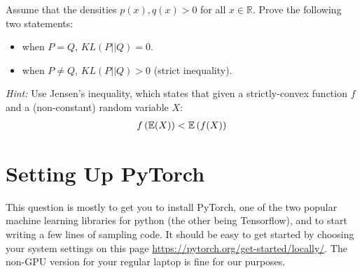 \documentclass[11pt]{article}
\begin{document}
\noindent Assume that the densities $p(x), q(x) > 0$ for all $x \in \mathbb{R}$. Prove the following two statements:
    \begin{itemize}
        \item when $P=Q$, $KL(P||Q)=0$.
        
        \item when $P \neq Q$, $KL(P||Q) > 0$ (strict inequality).\\
    \end{itemize}
    
\noindent \textit{Hint:} Use Jensen's inequality, which states that given a strictly-convex function $f$ and a (non-constant) random variable $X$:
\begin{align*}
    f\left( \mathbb{E}(X) \right) < \mathbb{E} \left( f (X) \right)
\end{align*}


\newpage 

\section{Setting Up PyTorch} 

This question is mostly to get you to install PyTorch, one of the two popular
machine learning libraries for python (the other being Tensorflow), and to start writing a few lines of sampling code. It should be easy to get started by choosing your system settings on this page
\href{https://pytorch.org/get-started/locally/}{https://pytorch.org/get-started/locally/}.
The non-GPU version for your regular laptop is fine for our purposes.\\
\end{document}
